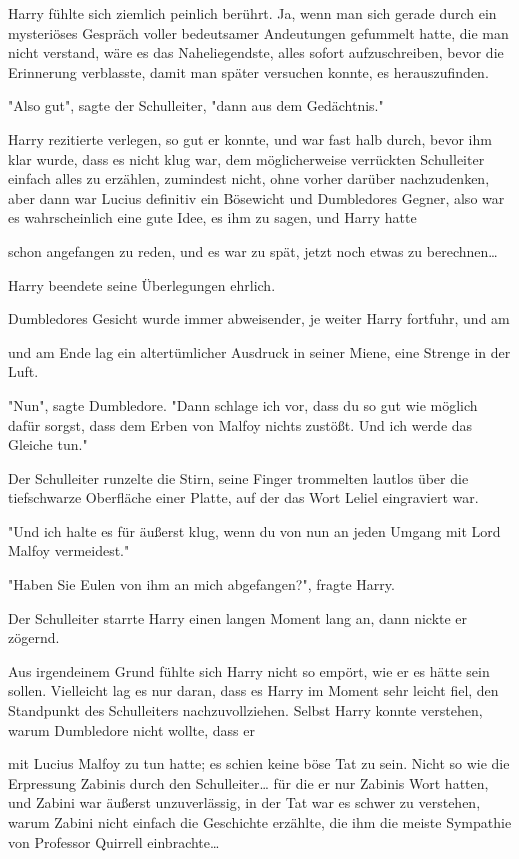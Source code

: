 {Harry fühlte sich ziemlich peinlich berührt. Ja, wenn man sich gerade durch ein mysteriöses Gespräch voller bedeutsamer Andeutungen gefummelt hatte, die man nicht verstand, wäre es das Naheliegendste, alles sofort aufzuschreiben, bevor die Erinnerung verblasste, damit man später versuchen konnte, es herauszufinden.

"Also gut", sagte der Schulleiter, "dann aus dem Gedächtnis."

Harry rezitierte verlegen, so gut er konnte, und war fast halb durch, bevor ihm klar wurde, dass es nicht klug war, dem möglicherweise verrückten Schulleiter einfach alles zu erzählen, zumindest nicht, ohne vorher darüber nachzudenken, aber dann war Lucius definitiv ein Bösewicht und Dumbledores Gegner, also war es wahrscheinlich eine gute Idee, es ihm zu sagen, und Harry hatte

schon angefangen zu reden, und es war zu spät, jetzt noch etwas zu berechnen…

Harry beendete seine Überlegungen ehrlich.

Dumbledores Gesicht wurde immer abweisender, je weiter Harry fortfuhr, und am

und am Ende lag ein altertümlicher Ausdruck in seiner Miene, eine Strenge in der Luft.

"Nun", sagte Dumbledore. "Dann schlage ich vor, dass du so gut wie möglich dafür sorgst, dass dem Erben von Malfoy nichts zustößt. Und ich werde das Gleiche tun."

Der Schulleiter runzelte die Stirn, seine Finger trommelten lautlos über die tiefschwarze Oberfläche einer Platte, auf der das Wort Leliel eingraviert war.

"Und ich halte es für äußerst klug, wenn du von nun an jeden Umgang mit Lord Malfoy vermeidest."

"Haben Sie Eulen von ihm an mich abgefangen?", fragte Harry.

Der Schulleiter starrte Harry einen langen Moment lang an, dann nickte er zögernd.

Aus irgendeinem Grund fühlte sich Harry nicht so empört, wie er es hätte sein sollen. Vielleicht lag es nur daran, dass es Harry im Moment sehr leicht fiel, den Standpunkt des Schulleiters nachzuvollziehen. Selbst Harry konnte verstehen, warum Dumbledore nicht wollte, dass er

mit Lucius Malfoy zu tun hatte; es schien keine böse Tat zu sein. Nicht so wie die Erpressung Zabinis durch den Schulleiter… für die er nur Zabinis Wort hatten, und Zabini war äußerst unzuverlässig, in der Tat war es schwer zu verstehen, warum Zabini nicht einfach die Geschichte erzählte, die ihm die meiste Sympathie von Professor Quirrell einbrachte…

}
